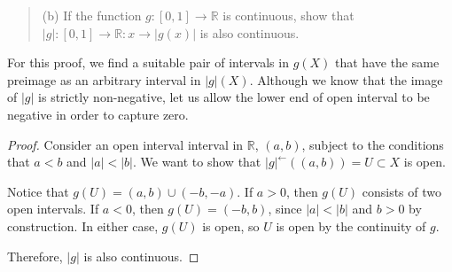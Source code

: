 \documentclass[11pt]{article}
\begin{document}
\begin{quote}
  (b) If the function $g:[0,1] \rightarrow \mathbb{R}$ is continuous,
  show that $|g| : [0,1] \rightarrow \mathbb{R} : x \rightarrow
  |g(x)|$ is also continuous.
\end{quote}

For this proof, we find a suitable pair of intervals in $g(X)$ that
have the same preimage as an arbitrary interval in $|g|(X)$.  Although
we know that the image of $|g|$ is strictly non-negative, let us allow
the lower end of open interval to be negative in order to capture
zero.

\begin{proof}
  Consider an open interval interval in $\mathbb{R}$, $(a,b)$, subject
  to the conditions that $a < b$ and $|a| < |b|$.  We want to show
  that $|g|^{\leftarrow}((a,b)) = U \subset X$ is open.

  Notice that $g(U) = (a,b) \cup (-b,-a)$.  If $a > 0$, then $g(U)$
  consists of two open intervals.  If $a < 0$, then $g(U) = (-b,b)$,
  since $|a| < |b|$ and $b > 0$ by construction.  In either case,
  $g(U)$ is open, so $U$ is open by the continuity of $g$.

  Therefore, $|g|$ is also continuous.

  
\end{proof}
\end{document}
